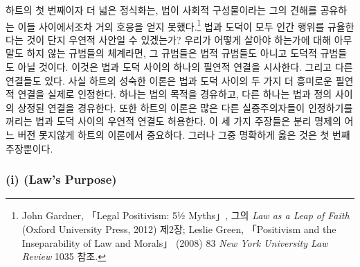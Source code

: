 하트의 첫 번째이자 더 넓은 정식화는, 법이 사회적 구성물이라는 그의
견해를 공유하는 이들 사이에서조차 거의 호응을 얻지 못했다.\footnote{John
  Gardner, 「Legal Positivism: 5½ Myths」, 그의 \emph{Law as a Leap of
  Faith} (Oxford University Press, 2012) 제2장; Leslie Green,
  「Positivism and the Inseparability of Law and Morals」 (2008) 83
  \emph{New York University Law Review} 1035 참조.} 법과 도덕이 모두
인간 행위를 규율한다는 것이 단지 우연적 사안일 수 있겠는가? 우리가
어떻게 살아야 하는가에 대해 아무 말도 하지 않는 규범들의 체계라면, 그
규범들은 법적 규범들도 아니고 도덕적 규범들도 아닐 것이다. 이것은 법과
도덕 사이의 하나의 필연적 연결을 시사한다. 그리고 다른 연결들도 있다.
사실 하트의 성숙한 이론은 법과 도덕 사이의 두 가지 더 흥미로운 필연적
연결을 실제로 인정한다. 하나는 법의 목적을 경유하고, 다른 하나는 법과
정의 사이의 상정된 연결을 경유한다. 또한 하트의 이론은 많은 다른
실증주의자들이 인정하기를 꺼리는 법과 도덕 사이의 우연적 연결도
허용한다. 이 세 가지 주장들은 분리 명제의 어느 버전 못지않게 하트의
이론에서 중요하다. 그러나 그중 명확하게 옳은 것은 첫 번째 주장뿐이다.

\subsubsection{\texorpdfstring{(i)  (Law's
Purpose)}{(i) 법의 목적 (Law's Purpose)}}\label{i-uxbc95uxc758-uxbaa9uxc801-laws-purpose}

